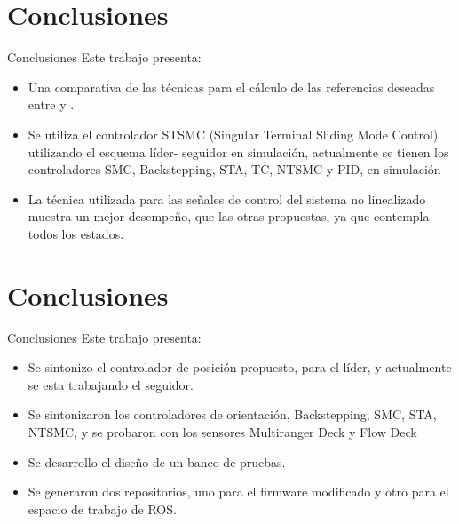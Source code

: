 \documentclass[hyperref={pdfpagelabels=false}]{beamer}
\begin{document}
\section{Conclusiones}
\begin{frame}{Conclusiones}
Este trabajo presenta:
\begin{itemize}
    \item Una comparativa de las técnicas para el c\'alculo de las referencias deseadas entre  y .

    \item Se utiliza el controlador STSMC (Singular Terminal Sliding Mode Control) utilizando el esquema líder- seguidor en simulación, actualmente se tienen los controladores SMC, Backstepping, STA, TC, NTSMC y PID, en simulaci\'on

    \item La técnica utilizada para las se\~nales de control del sistema no linealizado muestra un mejor desempe\~no, que las otras propuestas, ya que contempla todos los estados.
    

\end{itemize}


\end{frame}

\section{Conclusiones}
\begin{frame}{Conclusiones}
	Este trabajo presenta:
	\begin{itemize}
    \item Se sintonizo el controlador de posición propuesto, para el líder, y actualmente se esta trabajando el seguidor.

	\item Se sintonizaron los controladores de orientación, Backstepping, SMC, STA, NTSMC, y se probaron con los sensores Multiranger Deck y Flow Deck
	
	\item Se desarrollo el dise\~no de un banco de pruebas.
	
	\item Se generaron dos repositorios, uno para el firmware modificado y otro para el espacio de trabajo de ROS.
	\end{itemize}
	
	
\end{frame}
\end{document}
